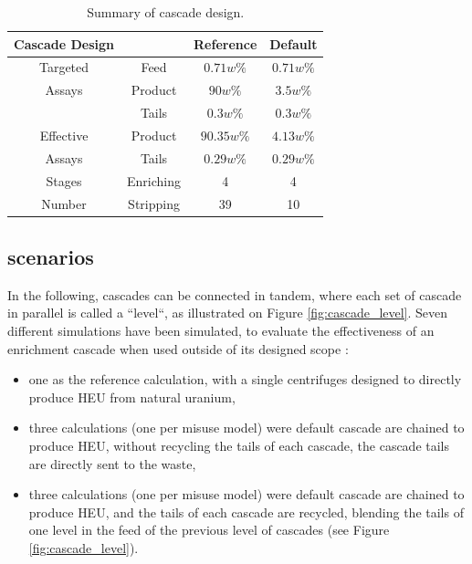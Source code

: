 \begin{table}[htb]
\centering
  \caption{Summary of cascade design.}
\begin{tabular}{cccc}
\toprule

Cascade Design &       & Reference   & Default    \\
\midrule
Targeted  & Feed       & $0.71w\%$   & $0.71w\%$  \\
Assays    & Product    & $90w\%$     & $3.5w\%$   \\
          & Tails      & $0.3w\%$   & $0.3w\%$   \\
\midrule
Effective & Product    & $90.35w\%$  & $4.13w\%$  \\
Assays    & Tails      & $0.29w\%$   & $0.29w\%$  \\ 
\midrule
Stages    & Enriching  & 4          & 4          \\
Number    & Stripping  & 39         & 10         \\
\bottomrule
\end{tabular}
  \label{tab:cascade_config}
\end{table}


\subsection{scenarios}
In the following, cascades can be connected in tandem, where each set of cascade
in parallel is called a ``level``, as illustrated on Figure
\ref{fig:cascade_level}.
Seven different simulations have been simulated, to evaluate the effectiveness
of an enrichment cascade when used outside of its designed scope :
\begin{itemize}
\item one as the reference calculation, with a single centrifuges designed to
    directly produce \gls{HEU} from natural uranium,
\item three calculations (one per misuse model) were default cascade are
    chained to produce \gls{HEU}, without recycling the tails of each cascade,
    the cascade tails are directly sent to the waste,
\item three calculations (one per misuse model) were default cascade are
    chained to produce \gls{HEU}, and the tails of each cascade are recycled, blending
    the tails of one level in the feed of the previous level of
    cascades (see Figure \ref{fig:cascade_level}).
\end{itemize}

